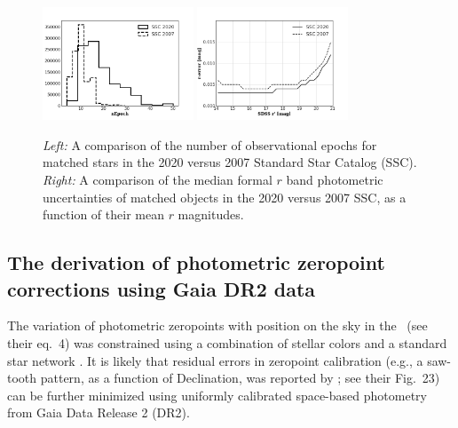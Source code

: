 \begin{figure}[th!]
\centering
\includegraphics[width=0.4\textwidth, keepaspectratio]{figures/nepoch_compOvsN_BW.png}
\includegraphics[width=0.4\textwidth, keepaspectratio]{figures/rerr_compOvsN_BW.png}
\caption{{\it Left:} A comparison of the number of observational epochs for matched stars in the 2020 versus 2007 Standard Star Catalog (SSC). {\it Right:} A comparison of the median formal $r$ band photometric uncertainties of matched objects in the 2020 versus 2007 SSC, as a function of their mean $r$ magnitudes.
\label{fig:rerr_nvso}}
\end{figure}


\subsection{The derivation of  photometric zeropoint corrections using Gaia DR2 data\label{sec:GaiaCorr}} 

The variation of photometric zeropoints with position on the sky in the \pOc\ (see their eq.~4) was 
constrained using a combination of stellar colors \citep[the principal axes in color-color diagrams, for details 
see][]{2004AN....325..583I} and a standard star network \citep{2002AJ....123.2121S,2006AN....327..821T}. It is likely that 
residual errors in zeropoint calibration (e.g., a saw-tooth pattern, as a function of Declination,
was reported by \citealt{2013A&A...552A.124B}; see their Fig.~23) can be further minimized using 
uniformly calibrated space-based photometry from Gaia Data Release 2 (DR2). 

